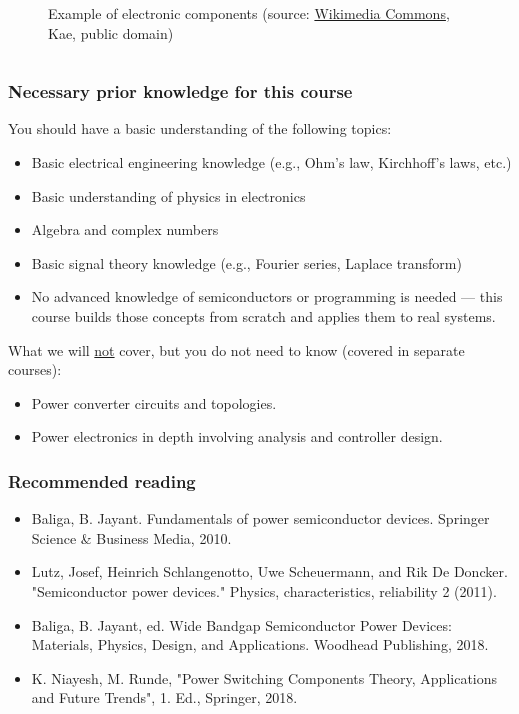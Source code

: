 \begin{frame}
\begin{columns}
\begin{column}{0.5\textwidth}
\begin{figure}
				\caption{Example of electronic components (source: \href{https://commons.wikimedia.org/wiki/File:Componentes.JPG}{Wikimedia Commons}, Kae, public domain)}
			\end{figure}
		\end{column}
		\end{columns}
\end{frame}


\begin{frame}
	\frametitle{Necessary prior knowledge for this course}
	You should have a basic understanding of the following topics:
	\begin{itemize}
		\item Basic electrical engineering knowledge (e.g., Ohm's law, Kirchhoff's laws, etc.)
		\item Basic understanding of physics in electronics
		\item Algebra and complex numbers
		\item Basic signal theory knowledge (e.g., Fourier series, Laplace transform)
		\item No advanced knowledge of semiconductors or programming is needed — this course builds those concepts from scratch and applies them to real systems.
	\end{itemize}
	\vspace{0.5cm}
	What we will \underline{not} cover, but you do not need to know (covered in separate courses):
	\begin{itemize}
		\item Power converter circuits and topologies.
		\item Power electronics in depth involving analysis and controller design. 
	\end{itemize}
\end{frame}

\begin{frame}
	\frametitle{Recommended reading}
	\begin{itemize}
		\item Baliga, B. Jayant. Fundamentals of power semiconductor devices. Springer Science \& Business Media, 2010.
		\item Lutz, Josef, Heinrich Schlangenotto, Uwe Scheuermann, and Rik De Doncker. "Semiconductor power devices." Physics, characteristics, reliability 2 (2011).
		\item Baliga, B. Jayant, ed. Wide Bandgap Semiconductor Power Devices: Materials, Physics, Design, and Applications. Woodhead Publishing, 2018.
		\item K. Niayesh, M. Runde, "Power Switching Components Theory, Applications and Future Trends", 1. Ed., Springer, 2018.
	\end{itemize}
\end{frame}